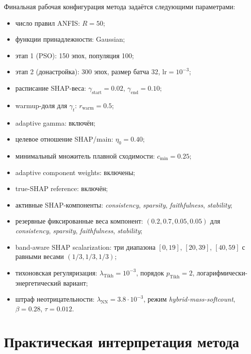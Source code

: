 \documentclass[11pt]{article}
\begin{document}
Финальная рабочая конфигурация метода задаётся следующими параметрами:
\begin{itemize}
    \item число правил ANFIS: $R=50$;
    \item функции принадлежности: Gaussian;
    \item этап 1 (PSO): 150 эпох, популяция 100;
    \item этап 2 (донастройка): 300 эпох, размер батча 32, $\mathrm{lr}=10^{-3}$;
    \item расписание SHAP-веса: $\gamma_{\mathrm{start}}=0.02$, $\gamma_{\mathrm{end}}=0.10$;
    \item warmup-доля для $\gamma_t$: $r_{\mathrm{warm}}=0.5$;
    \item adaptive gamma: включён;
    \item целевое отношение SHAP/main: $\eta_0=0.40$;
    \item минимальный множитель плавной сходимости: $c_{\min}=0.25$;
    \item adaptive component weights: включены;
    \item true-SHAP reference: включён;
    \item активные SHAP-компоненты: \textit{consistency}, \textit{sparsity}, \textit{faithfulness}, \textit{stability};
    \item резервные фиксированные веса компонент: $(0.2, 0.7, 0.05, 0.05)$ для \textit{consistency}, \textit{sparsity}, \textit{faithfulness}, \textit{stability};
    \item band-aware SHAP scalarization: три диапазона $[0,19]$, $[20,39]$, $[40,59]$ с равными весами $(1/3,1/3,1/3)$;
    \item тихоновская регуляризация: $\lambda_{\mathrm{Tikh}}=10^{-3}$, порядок $p_{\mathrm{Tikh}}=2$, логарифмически-энергетический вариант;
    \item штраф неотрицательности: $\lambda_{\mathrm{NN}}=3.8\cdot 10^{-3}$, режим \textit{hybrid-mass-softcount}, $\beta=0.28$, $\tau=0.012$.
\end{itemize}

\section{Практическая интерпретация метода}
\end{document}
